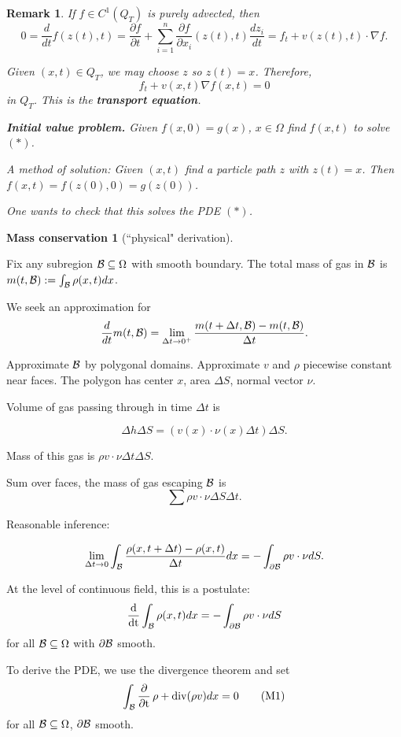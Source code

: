 \documentclass[11pt]{amsart}%
\newtheorem{remark}{Remark}
\DeclareMathOperator{\dt}{\frac{d}{dt}}
\DeclareMathOperator{\pt}{\frac{\partial}{\partial t}}
\DeclareMathOperator{\dive}{div}
\begin{document}
\begin{remark}
    If $f\in C^1(Q_T)$ is purely advected, then
    $$0=\frac{d}{dt}f(z(t),t)=\frac{\partial f}{\partial t} +\sum_{i=1}^n \frac{\partial f}{\partial x_i}(z(t),t)\frac{dz_i}{dt} = f_t + v(z(t),t)\cdot\nabla f.$$

Given $(x,t)\in Q_T$, we  may choose $z$ so $z(t)=x$. Therefore,
\[f_t + v(x,t)\nabla f(x,t) =0 \tag{*}\]
in $Q_T$. This is the {\bf transport equation}.

{\bf Initial value problem.} Given $f(x,0)=g(x)$, $x\in \Omega$ find $f(x,t)$ to solve $(*)$.

A method of solution: Given $(x,t)$ find a particle path $z$ with $z(t)=x$. Then $f(x,t)=f(z(0),0)=g(z(0))$.

One wants to check that this solves the PDE $(*)$.
\end{remark}

{\bf Mass conservation 1} (``physical" derivation).

Fix any subregion $\mathcal{B}\subseteq \Omega$ with smooth boundary. The total mass of gas in $\mathcal{B}$ is $m(t,\mathcal{B}):=\int_{\mathcal{B}} \rho(x,t)dx$.

We seek an approximation for $$\frac{d}{dt}m(t,\mathcal{B}) = \lim_{\Delta t \to 0^+}\frac{m(t+\Delta t,\mathcal{B})-m(t,\mathcal{B})}{\Delta t}.$$

Approximate $\mathcal{B}$ by polygonal domains. Approximate $v$ and $\rho$ piecewise constant near faces. The polygon has center $x$, area $\Delta S$, normal vector $\nu$.

Volume of gas passing through in time $\Delta t$ is

$$\Delta h \Delta S = (v(x)\cdot\nu(x)\Delta t)\Delta S.$$

Mass of this gas is $\rho v\cdot \nu \Delta t \Delta S$.

Sum over faces, the mass of gas escaping $\mathcal{B}$ is
$$\sum \rho v\cdot \nu \Delta S\Delta t.$$

Reasonable inference: 

$$\lim_{\Delta t\to 0} \int_{\mathcal{B}} \frac{\rho(x,t+\Delta t)-\rho(x,t)}{\Delta t} dx = -\int_{\partial \mathcal{B}} \rho v\cdot \nu dS.$$

At the level of continuous field, this is a postulate:
\[ \dt \int_{\cB} \rho(x,t)dx =-\int_{\partial\cB}\rho v\cdot \nu dS\]
for all $\mathcal{B} \subseteq \Omega$ with $\partial \mathcal{B}$ smooth.

To derive the PDE, we use the divergence theorem and set
\[ \int_{{\cB}} \pt\rho + \dive(\rho v) dx =0 \tag{M1}\]
for all $\mathcal{B} \subseteq \Omega$, $\partial \mathcal{B}$ smooth.
\end{document}

